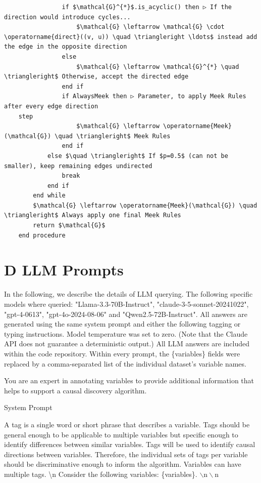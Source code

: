 \documentclass[10pt]{article}
\begin{document}
\begin{verbatim}
                if $\mathcal{G}^{*}$.is_acyclic() then ▷ If the direction would introduce cycles...
                    $\mathcal{G} \leftarrow \mathcal{G} \cdot \operatorname{direct}((v, u)) \quad \triangleright \ldots$ instead add the edge in the opposite direction
                else
                    $\mathcal{G} \leftarrow \mathcal{G}^{*} \quad \triangleright$ Otherwise, accept the directed edge
                end if
                if AlwaysMeek then ▷ Parameter, to apply Meek Rules after every edge direction
    step
                    $\mathcal{G} \leftarrow \operatorname{Meek}(\mathcal{G}) \quad \triangleright$ Meek Rules
                end if
            else $\quad \triangleright$ If $p=0.5$ (can not be smaller), keep remaining edges undirected
                break
            end if
        end while
        $\mathcal{G} \leftarrow \operatorname{Meek}(\mathcal{G}) \quad \triangleright$ Always apply one final Meek Rules
        return $\mathcal{G}$
    end procedure
\end{verbatim}

\section*{D LLM Prompts}
In the following, we describe the details of LLM querying. The following specific models where queried: "Llama-3.3-70B-Instruct", "claude-3-5-sonnet-20241022", "gpt-4-0613", "gpt-4o-2024-08-06" and "Qwen2.5-72B-Instruct". All answers are generated using the same system prompt and either the following tagging or typing instructions. Model temperature was set to zero. (Note that the Claude API does not guarantee a deterministic output.) All LLM answers are included within the code repository. Within every prompt, the \{variables\} fields were replaced by a comma-separated list of the individual dataset's variable names.

You are an expert in annotating variables to provide additional information that helps to support a causal discovery algorithm.

System Prompt

A tag is a single word or short phrase that describes a variable. Tags should be general enough to be applicable to multiple variables but specific enough to identify differences between similar variables. Tags will be used to identify causal directions between variables. Therefore, the individual sets of tags per variable should be discriminative enough to inform the algorithm. Variables can have multiple tags. \textbackslash n Consider the following variables: \{variables\}. $\backslash \mathrm{n} \backslash \mathrm{n}$
\end{document}
